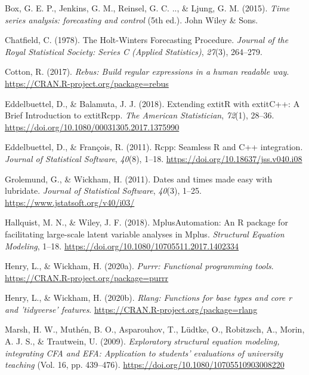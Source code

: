 \documentclass[
  english,
  man,floatsintext]{apa7}
\begin{document}
\leavevmode\hypertarget{ref-Box2015}{}%
Box, G. E. P., Jenkins, G. M., Reinsel, G. C. .., \& Ljung, G. M. (2015). \emph{Time series analysis: forecasting and control} (5th ed.). John Wiley \& Sons.

\leavevmode\hypertarget{ref-Chatfield1978}{}%
Chatfield, C. (1978). The Holt-Winters Forecasting Procedure. \emph{Journal of the Royal Statistical Society: Series C (Applied Statistics)}, \emph{27}(3), 264--279.

\leavevmode\hypertarget{ref-R-rebus}{}%
Cotton, R. (2017). \emph{Rebus: Build regular expressions in a human readable way}. \url{https://CRAN.R-project.org/package=rebus}

\leavevmode\hypertarget{ref-R-Rcpp_b}{}%
Eddelbuettel, D., \& Balamuta, J. J. (2018). Extending extitR with extitC++: A Brief Introduction to extitRcpp. \emph{The American Statistician}, \emph{72}(1), 28--36. \url{https://doi.org/10.1080/00031305.2017.1375990}

\leavevmode\hypertarget{ref-R-Rcpp_a}{}%
Eddelbuettel, D., \& François, R. (2011). Rcpp: Seamless R and C++ integration. \emph{Journal of Statistical Software}, \emph{40}(8), 1--18. \url{https://doi.org/10.18637/jss.v040.i08}

\leavevmode\hypertarget{ref-R-lubridate}{}%
Grolemund, G., \& Wickham, H. (2011). Dates and times made easy with lubridate. \emph{Journal of Statistical Software}, \emph{40}(3), 1--25. \url{https://www.jstatsoft.org/v40/i03/}

\leavevmode\hypertarget{ref-R-MplusAutomation}{}%
Hallquist, M. N., \& Wiley, J. F. (2018). MplusAutomation: An R package for facilitating large-scale latent variable analyses in Mplus. \emph{Structural Equation Modeling}, 1--18. \url{https://doi.org/10.1080/10705511.2017.1402334}

\leavevmode\hypertarget{ref-R-purrr}{}%
Henry, L., \& Wickham, H. (2020a). \emph{Purrr: Functional programming tools}. \url{https://CRAN.R-project.org/package=purrr}

\leavevmode\hypertarget{ref-R-rlang}{}%
Henry, L., \& Wickham, H. (2020b). \emph{Rlang: Functions for base types and core r and 'tidyverse' features}. \url{https://CRAN.R-project.org/package=rlang}

\leavevmode\hypertarget{ref-Marsh2009}{}%
Marsh, H. W., Muthén, B. O., Asparouhov, T., Lüdtke, O., Robitzsch, A., Morin, A. J. S., \& Trautwein, U. (2009). \emph{Exploratory structural equation modeling, integrating CFA and EFA: Application to students' evaluations of university teaching} (Vol. 16, pp. 439--476). \url{https://doi.org/10.1080/10705510903008220}
\end{document}
